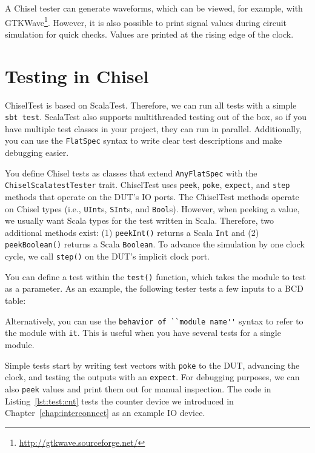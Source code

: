 \documentclass[%
    10pt,
    headinclude, footexclude,
    openright, %
    notitlepage,
    cleardoubleempty,
    headsepline,
    pointlessnumbers,
    bibtotoc, idxtotoc,
    ]{scrbook}
\newcommand{\code}[1]{{\lstinline[basicstyle=\small\ttfamily]{#1}}}
\newcommand{\myref}[2]{\href{#1}{#2}}
\renewcommand{\myref}[2]{{#2}{\footnote{\url{#1}}}}
\begin{document}
A Chisel tester can generate waveforms, which can be viewed, for example, with \myref{http://gtkwave.sourceforge.net/}{GTKWave}.
However, it is also possible to print signal values during circuit simulation for quick checks.
Values are printed at the rising edge of the clock.


\section{Testing in Chisel}

ChiselTest is based on ScalaTest. Therefore, we can run all tests with a simple \code{sbt test}.
ScalaTest also supports multithreaded testing out of the box, so if you have multiple
test classes in your project, they can run in parallel. Additionally, you can use
the \code{FlatSpec} syntax to write clear test descriptions and make debugging easier.

You define Chisel tests as classes that extend \code{AnyFlatSpec} with
the\\ \code{ChiselScalatestTester} trait. ChiselTest uses \code{peek},
\code{poke}, \code{expect}, and \code{step} methods that operate on the DUT's IO ports.
The ChiselTest methods operate on Chisel types (i.e., \code{UInt}s,
\code{SInt}s, and \code{Bool}s). However, when peeking a value, we
usually want Scala types for the test written in Scala.
Therefore, two additional methods exist: (1) \code{peekInt()} returns a
Scala \code{Int} and (2) \code{peekBoolean()} returns a Scala \code{Boolean}.
To advance the simulation by one clock cycle,
we call \code{step()} on the DUT's implicit clock port.

You can define a test within the \code{test()} function, which takes the module to test as
a parameter. As an example, the following tester tests a few inputs to a BCD table:


Alternatively, you can use the \code{behavior of ``module name''} syntax to
refer to the module with \code{it}. This is useful when you have several tests for a
single module.


Simple tests start by writing test vectors with \code{poke} to the DUT, advancing the
clock, and testing the outputs with an \code{expect}. For debugging purposes, we can also
\code{peek} values and print them out for manual inspection. The code in Listing~\ref{lst:test:cnt} tests the
counter device we introduced in Chapter~\ref{chap:interconnect} as an example IO device.
\end{document}
